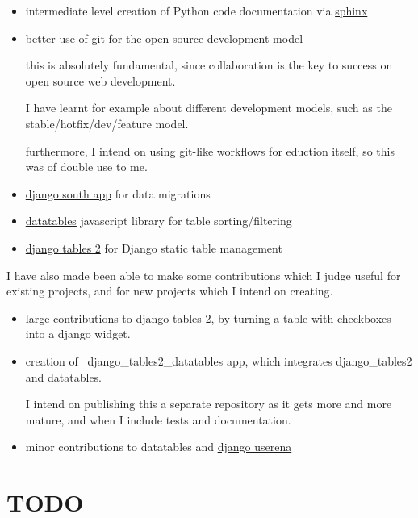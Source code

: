 \documentclass[12pt]{article}
\begin{document}
\begin{itemize}

  \item intermediate level creation of Python code documentation via \href{http://sphinx-doc.org/}{sphinx}

  \item better use of git for the open source development model
  
    this is absolutely fundamental, since collaboration is the key to success on open source
    web development.
    
    I have learnt for example about different development models, such as the stable/hotfix/dev/feature model.
    
    furthermore, I intend on using git-like workflows for eduction itself, so this was
    of double use to me.
    
  \item \href{http://south.aeracode.org/}{django south app} for data migrations
  \item \href{http://www.datatables.net}{datatables} javascript library for table sorting/filtering
  \item \href{https://github.com/bradleyayers/django-tables2/issues}{django tables 2} for Django static
    table management
\end{itemize}

I have also made been able to make some contributions which I judge useful for existing projects,
and for new projects which I intend on creating.

\begin{itemize}
  \item large contributions to django tables 2, by turning a table with checkboxes into a django widget.
  \item creation of \ django_tables2_datatables app, which integrates django_tables2 and datatables.
  
    I intend on publishing this a separate repository as it gets more and more mature, and when I
    include tests and documentation.
  
  \item minor contributions to datatables and
    \href{https://github.com/bread-and-pepper/django-userena/}{django userena}
\end{itemize}

\section{TODO} \label{todo}
\end{document}
